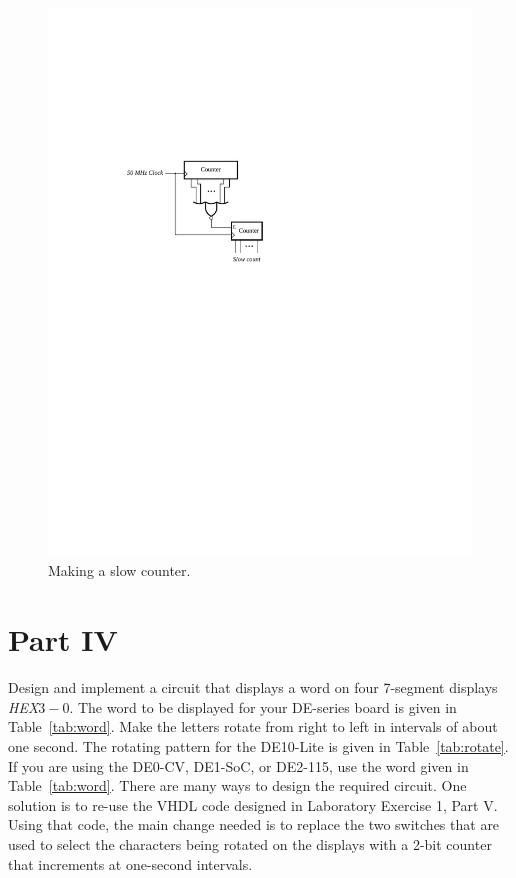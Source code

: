 \documentclass[epsfig,10pt,fullpage]{article}
\begin{document}
\begin{figure}[H]
	\begin{center}
		\includegraphics[]{figures/figure_hint.pdf}
	\end{center}
\caption{Making a slow counter.}
\label{fig:hint}
\end{figure}

\section*{Part IV}
Design and implement a circuit that displays a word on four 7-segment displays {\it HEX}$3-0$.
The word to be displayed for your DE-series board is given in Table~\ref{tab:word}.
Make the letters rotate from right to left in intervals of about one second.
The rotating pattern for the DE10-Lite is given in Table~\ref{tab:rotate}.
If you are using the DE0-CV, DE1-SoC, or DE2-115, use the word given in Table~\ref{tab:word}.
There are many ways to design the required circuit. One solution is to re-use the VHDL code 
designed in Laboratory Exercise 1, Part V. Using that code, the main change needed is to 
replace the two switches that are used to select the characters being rotated on the displays
with a 2-bit counter that increments at one-second intervals.
\end{document}
